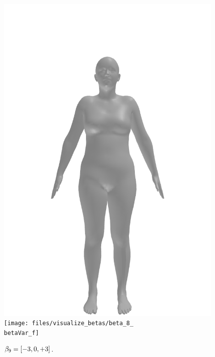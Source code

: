 \begin{figure}[ht!]
\begin{minipage}[b]{\textwidth}
        \includegraphics[width=\imgWidth]{files/visualize_betas/baseline_f}
        \texttt{[image: files/visualize\_betas/beta\_8\_\\betaVar\_f]}
        \caption[Effect of varying $\beta_9$ in SMPL.]{$\beta_9 = [-3, 0, +3]$.}
    \end{minipage}
\end{figure}

